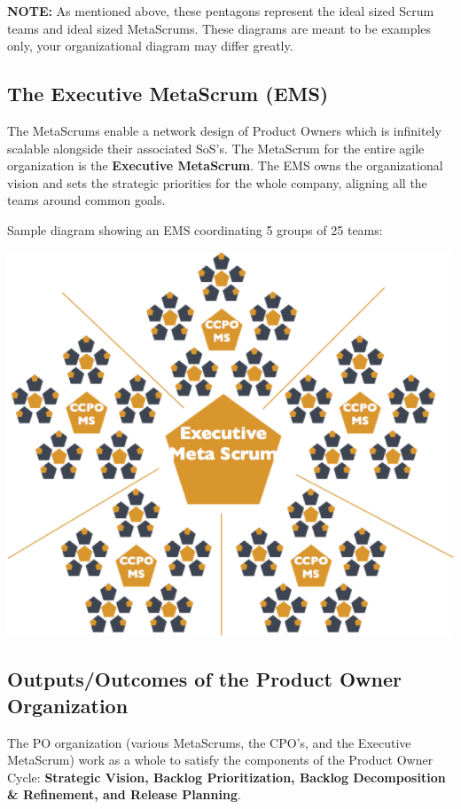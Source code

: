 \documentclass[12pt,a4paper,parskip=full]{scrartcl}
\begin{document}
\textbf{NOTE:} As mentioned above, these pentagons represent the ideal
sized Scrum teams and ideal sized MetaScrums. These diagrams are meant to
be examples only, your organizational diagram may differ greatly.

\subsection{The Executive MetaScrum (EMS)}
The MetaScrums enable a network design of Product Owners which is
infinitely scalable alongside their associated SoS's. The MetaScrum for the
entire agile organization is the \textbf{Executive MetaScrum}. The EMS owns
the organizational vision and sets the strategic priorities for the whole
company, aligning all the teams around common goals.

Sample diagram showing an EMS coordinating 5 groups of 25 teams:

\includegraphics[width=1.0\linewidth]{ExecMetaScrum.png}

\subsection{Outputs/Outcomes of the Product Owner Organization}
The PO organization (various MetaScrums, the CPO's, and the Executive
MetaScrum) work as a whole to satisfy the components of the Product Owner
Cycle: \textbf{Strategic Vision, Backlog Prioritization, Backlog
Decomposition \& Refinement, and Release Planning}.
\end{document}
